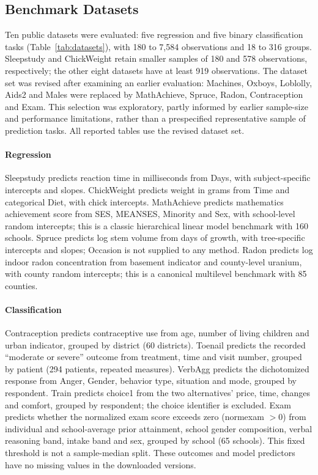 \subsection{Benchmark Datasets}

Ten public datasets were evaluated: five regression and five binary classification tasks (Table~\ref{tab:datasets}), with 180 to 7,584 observations and 18 to 316 groups. Sleepstudy and ChickWeight retain smaller samples of 180 and 578 observations, respectively; the other eight datasets have at least 919 observations. The dataset set was revised after examining an earlier evaluation: Machines, Oxboys, Loblolly, Aids2 and Males were replaced by MathAchieve, Spruce, Radon, Contraception and Exam. This selection was exploratory, partly informed by earlier sample-size and performance limitations, rather than a prespecified representative sample of prediction tasks. All reported tables use the revised dataset set.


\FloatBarrier

\paragraph{Regression}
Sleepstudy predicts reaction time in milliseconds from Days, with subject-specific intercepts and slopes. ChickWeight predicts weight in grams from Time and categorical Diet, with chick intercepts. MathAchieve predicts mathematics achievement score from SES, MEANSES, Minority and Sex, with school-level random intercepts; this is a classic hierarchical linear model benchmark with 160 schools. Spruce predicts log stem volume from days of growth, with tree-specific intercepts and slopes; Occasion is not supplied to any method. Radon predicts log indoor radon concentration from basement indicator and county-level uranium, with county random intercepts; this is a canonical multilevel benchmark with 85 counties.

\paragraph{Classification}
Contraception predicts contraceptive use from age, number of living children and urban indicator, grouped by district (60 districts). Toenail predicts the recorded ``moderate or severe'' outcome from treatment, time and visit number, grouped by patient (294 patients, repeated measures). VerbAgg predicts the dichotomized response from Anger, Gender, behavior type, situation and mode, grouped by respondent. Train predicts choice1 from the two alternatives' price, time, changes and comfort, grouped by respondent; the choice identifier is excluded. Exam predicts whether the normalized exam score exceeds zero (normexam $> 0$) from individual and school-average prior attainment, school gender composition, verbal reasoning band, intake band and sex, grouped by school (65 schools). This fixed threshold is not a sample-median split. These outcomes and model predictors have no missing values in the downloaded versions.

